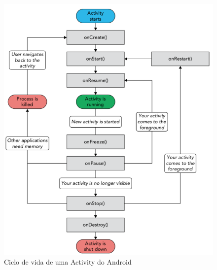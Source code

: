 \begin{figure}[htb]
    \centering
    \includegraphics[width=\textwidth]{images/android_activity_lifecycle}
    \caption[Ciclo de vida de uma Activity do Android]
    {Ciclo de vida de uma Activity do Android}
    \label{fig:android_activity_lifecycle}
\end{figure}